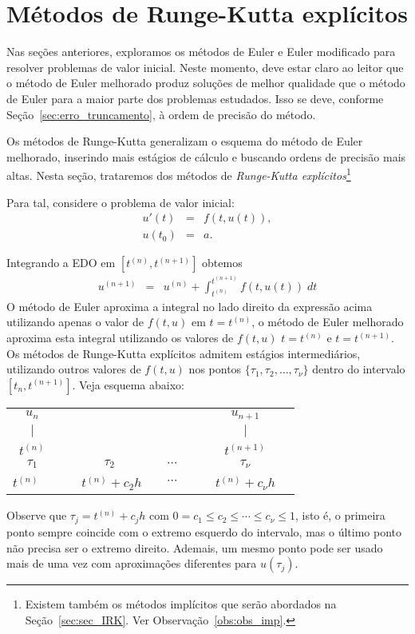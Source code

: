 \section{Métodos de Runge-Kutta explícitos}\label{sec:sec_RK}
Nas seções anteriores, exploramos os métodos de Euler e Euler modificado para resolver problemas de valor inicial. Neste momento, deve estar claro ao leitor que o método de Euler melhorado produz soluções de melhor qualidade que o método de Euler para a maior parte dos problemas estudados. Isso se deve, conforme Seção~\ref{sec:erro_truncamento}, à ordem de precisão do método.

Os métodos de Runge-Kutta generalizam o esquema do método de Euler melhorado, inserindo mais estágios de cálculo e buscando ordens de precisão mais altas. Nesta seção, trataremos dos métodos de \emph{Runge-Kutta explícitos}\footnote{Existem também os métodos implícitos que serão abordados na Seção~\ref{sec:sec_IRK}. Ver Observação~\ref{obs:obs_imp}.}

Para tal, considere o  problema de valor inicial:
\begin{eqnarray}
  u'(t) &=&f(t,u(t)), \\
  u(t_0) &=&a.
\end{eqnarray}

Integrando a EDO em $[t^{(n)},t^{(n+1)}]$ obtemos
\begin{eqnarray}
  u^{(n+1)}  &=&u^{(n)}  + \int _{t^{(n)}}^{t^{(n+1)}} f(t,u(t)) \; dt
\end{eqnarray}
O método de Euler aproxima a integral no lado direito da expressão acima utilizando apenas o valor de $f(t,u)$ em $t=t^{(n)}$, o método de Euler melhorado aproxima esta integral utilizando os valores de $f(t,u)$ $t=t^{(n)}$ e $t=t^{(n+1)}$. Os métodos de Runge-Kutta explícitos admitem estágios intermediários, utilizando outros valores de $f(t,u)$ nos pontos $\{\tau_1,\tau_2,\ldots,\tau_\nu\}$ dentro do intervalo $[t_n,t^{(n+1)}]$. Veja esquema abaixo:
\begin{center}
\begin{tabular}{c c c c c}
  $u_n$ &      &       &      & $u_{n+1}$ \\
  $|$   &      &       &      &  $|$  \\ \hline
  $t^{(n)}$ &      &       &      & $t^{(n+1)}$ \\
  $\tau _1$  & $\tau _2$ & $\cdots $ &      & $\tau_\nu $\\
  $t^{(n)}$~~  &~~ $t^{(n)}+c_2h$~~ & $\cdots $ &      & ~~$t^{(n)}+c_\nu h $~~
  \end{tabular}
\end{center}
Observe que $\tau_j=t^{(n)}+c_jh$ com $0=c_1 \leq c_2 \leq \cdots \leq c_\nu \leq 1$, isto é, o primeira ponto sempre coincide com o extremo esquerdo do intervalo, mas o último ponto não precisa ser o extremo direito. Ademais, um mesmo ponto pode ser usado mais de uma vez com aproximações diferentes para $u(\tau_j)$.

